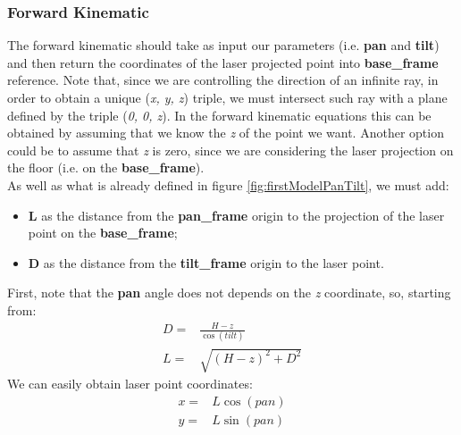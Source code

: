 \subsubsection{Forward Kinematic}
The forward kinematic should take as input our parameters (i.e. \textbf{pan} and \textbf{tilt}) and then return the coordinates of the laser projected point into \textbf{base\_frame} reference. 
Note that, since we are controlling the direction of an infinite ray, in order to obtain a unique (\textit{x, y, z}) triple, we must intersect such ray with a plane defined by the triple (\textit{0, 0, z}). In the forward kinematic equations this can be obtained by assuming that we know the \textit{z} of the point we want. Another option could be to assume that \textit{z} is zero, since we are considering the laser projection on the floor (i.e. on the \textbf{base\_frame}). \\
As well as what is already defined in figure \ref{fig:firstModelPanTilt}, we must add:
\begin{itemize}
    \item \textbf{L} as the distance from the \textbf{pan\_frame} origin to the projection of the laser point on the \textbf{base\_frame};
    \item \textbf{D} as the distance from the \textbf{tilt\_frame} origin to the laser point.
\end{itemize}
First, note that the \textbf{pan} angle does not depends on the \textit{z} coordinate, so, starting from:
\begin{align}
	D=& \frac{H-z}{\cos{(tilt)}} \label{eq:d}\\
	L=& \sqrt{(H-z)^2 + D^2}
\end{align}
We can easily obtain laser point coordinates:
\begin{align}
	x=& L\cos{(pan)}\label{eq:x}\\
	y=& L\sin{(pan)} \label{eq:y}
\end{align}

